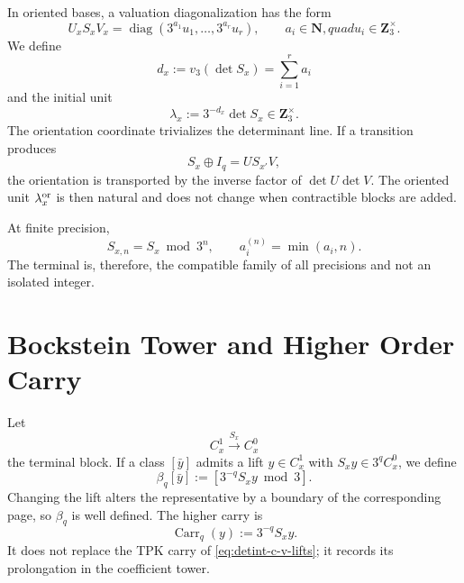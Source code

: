 In oriented bases, a valuation diagonalization has the form
\begin{equation}\label{eq:detint-smith}
 U_xS_xV_x
 =\operatorname{diag}(3^{a_1}u_1,\ldots,3^{a_r}u_r),
 \qquad
 a_i\in\mathbf N,quad u_i\in\mathbf Z_3^\times.
\end{equation}
We define
\begin{equation}\label{eq:detint-orden-d}
 d_x:=v_3(\det S_x)=\sum_{i=1}^r a_i
\end{equation}
and the initial unit
\begin{equation}\label{eq:detint-leading-unit}
 \lambda_x:=3^{-d_x}\det S_x\in\mathbf Z_3^\times.
\end{equation}
The orientation coordinate trivializes the determinant line. If a
transition produces
\begin{equation}\label{eq:detint-estabilidad-bloques}
 S_x\oplus I_q=U S_{x'}V,
\end{equation}
the orientation is transported by the inverse factor of \(\det U\det V\).
The oriented unit \(\lambda_x^{\rm or}\) is then natural and does not change
when contractible blocks are added.

At finite precision,
\begin{equation}\label{eq:detint-smith-finito}
 S_{x,n}=S_x\bmod3^n,
 \qquad
 a_i^{(n)}=\min(a_i,n).
\end{equation}
The terminal is, therefore, the compatible family of all precisions
and not an isolated integer.

\section{Bockstein Tower and Higher Order Carry}

Let
\[
 C_x^1\xrightarrow{S_x}C_x^0
\]
the terminal block. If a class \([\bar y]\) admits a lift
\(y\in C_x^1\) with \(S_xy\in3^qC_x^0\), we define
\begin{equation}\label{eq:detint-beta-q}
 \beta_q[\bar y]
 :=\left[3^{-q}S_xy\bmod3\right].
\end{equation}
Changing the lift alters the representative by a boundary of the corresponding
page, so \(\beta_q\) is well defined. The higher
carry is
\begin{equation}\label{eq:detint-carry-superior}
 \operatorname{Carr}_q(y):=3^{-q}S_xy.
\end{equation}
It does not replace the TPK carry of \eqref{eq:detint-c-v-lifts}; it records its
prolongation in the coefficient tower.

